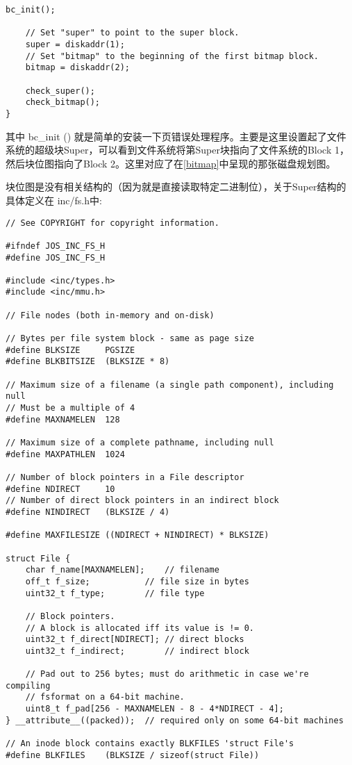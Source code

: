\documentclass{article}
\newcommand{\funcname}[1]{{\ttfamily \small #1}}
\begin{document}
\begin{CJK*}{UTF8}{gkai}
\begin{lstlisting}[style=ccode, title={\scriptsize \ttfamily \bfseries fs/fs.c: fs\_init()}]
	bc_init();

	// Set "super" to point to the super block.
	super = diskaddr(1);
	// Set "bitmap" to the beginning of the first bitmap block.
	bitmap = diskaddr(2);

	check_super();
	check_bitmap();
}
\end{lstlisting}

其中 \funcname{bc\_init ()} 就是简单的安装一下页错误处理程序。主要是这里设置起了文件系统的超级块Super，可以看到文件系统将第Super块指向了文件系统的Block 1，然后块位图指向了Block 2。这里对应了在\ref{bitmap}中呈现的那张磁盘规划图。

块位图是没有相关结构的（因为就是直接读取特定二进制位），关于Super结构的具体定义在 inc/fs.h中:


\begin{lstlisting}[style=ccode, title={\scriptsize \ttfamily \bfseries inc/fs.h}]
// See COPYRIGHT for copyright information.

#ifndef JOS_INC_FS_H
#define JOS_INC_FS_H

#include <inc/types.h>
#include <inc/mmu.h>

// File nodes (both in-memory and on-disk)

// Bytes per file system block - same as page size
#define BLKSIZE		PGSIZE
#define BLKBITSIZE	(BLKSIZE * 8)

// Maximum size of a filename (a single path component), including null
// Must be a multiple of 4
#define MAXNAMELEN	128

// Maximum size of a complete pathname, including null
#define MAXPATHLEN	1024

// Number of block pointers in a File descriptor
#define NDIRECT		10
// Number of direct block pointers in an indirect block
#define NINDIRECT	(BLKSIZE / 4)

#define MAXFILESIZE	((NDIRECT + NINDIRECT) * BLKSIZE)

struct File {
	char f_name[MAXNAMELEN];	// filename
	off_t f_size;			// file size in bytes
	uint32_t f_type;		// file type

	// Block pointers.
	// A block is allocated iff its value is != 0.
	uint32_t f_direct[NDIRECT];	// direct blocks
	uint32_t f_indirect;		// indirect block

	// Pad out to 256 bytes; must do arithmetic in case we're compiling
	// fsformat on a 64-bit machine.
	uint8_t f_pad[256 - MAXNAMELEN - 8 - 4*NDIRECT - 4];
} __attribute__((packed));	// required only on some 64-bit machines

// An inode block contains exactly BLKFILES 'struct File's
#define BLKFILES	(BLKSIZE / sizeof(struct File))


\end{lstlisting}
\end{CJK*}
\end{document}

